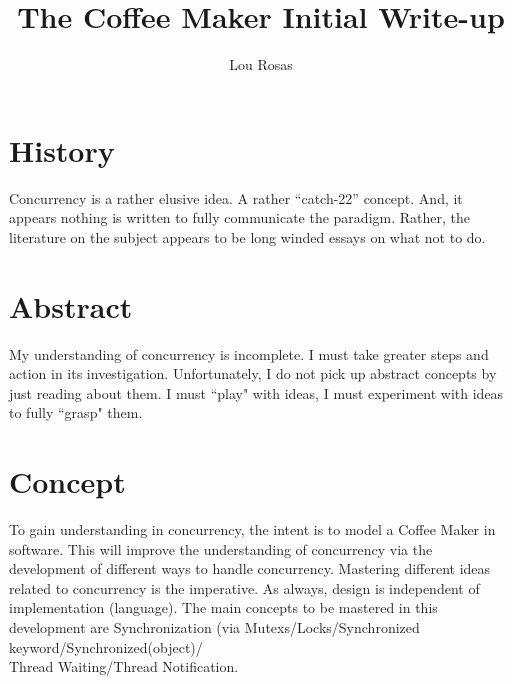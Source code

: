 \documentclass[letterpaper]{article}
\begin{document}
\title{The Coffee Maker Initial Write-up}
\author{Lou Rosas}
\maketitle

\section{History}
Concurrency is a rather elusive idea.  A rather “catch-22” concept.
And, it appears nothing is written to fully communicate the paradigm.
Rather, the literature on the subject appears to be long winded essays
on what not to do.
\section{Abstract}
My understanding of concurrency is incomplete.
I must take greater steps and action in its investigation.
Unfortunately, I do not pick up abstract concepts by just reading
about them.  I must ``play" with ideas, I must experiment with ideas
to fully ``grasp" them.
\section{Concept}
To gain understanding in concurrency, the intent is to model a Coffee
Maker in software.  This will improve the understanding of concurrency
via the development of different ways to handle concurrency.  
Mastering different ideas related to concurrency is the imperative.
As always, design is independent of implementation (language).  The
main concepts to be mastered in this development are Synchronization
(via Mutexs/Locks/Synchronized keyword/Synchronized(object)/\\Thread
Waiting/Thread Notification.
\end{document}
